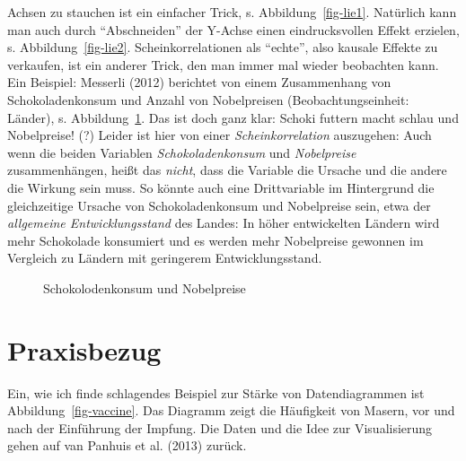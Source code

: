 \documentclass[
  letterpaper,
  oneside,
  open=any]{scrbook}
\theoremstyle{definition}
\theoremstyle{definition}
\theoremstyle{definition}
\theoremstyle{remark}
\begin{document}
Achsen zu stauchen ist ein einfacher Trick, s. Abbildung~\ref{fig-lie1}.
Natürlich kann man auch durch \enquote{Abschneiden} der Y-Achse einen
eindrucksvollen Effekt erzielen, s. Abbildung~\ref{fig-lie2}.
Scheinkorrelationen als \enquote{echte}, also kausale Effekte zu
verkaufen, ist ein anderer Trick, den man immer mal wieder beobachten
kann. Ein Beispiel: Messerli (2012) berichtet von einem Zusammenhang von
Schokoladenkonsum und Anzahl von Nobelpreisen (Beobachtungseinheit:
Länder), s. Abbildung~\ref{fig-choc}. Das ist doch ganz klar: Schoki
futtern macht schlau und Nobelpreise! (?) Leider ist hier von einer
\emph{Scheinkorrelation} auszugehen: Auch wenn die beiden Variablen
\emph{Schokoladenkonsum} und \emph{Nobelpreise} zusammenhängen, heißt
das \emph{nicht}, dass die Variable die Ursache und die andere die
Wirkung sein muss. So könnte auch eine Drittvariable im Hintergrund die
gleichzeitige Ursache von Schokoladenkonsum und Nobelpreise sein, etwa
der \emph{allgemeine Entwicklungsstand} des Landes: In höher
entwickelten Ländern wird mehr Schokolade konsumiert und es werden mehr
Nobelpreise gewonnen im Vergleich zu Ländern mit geringerem
Entwicklungsstand.

\begin{figure}


\caption{\label{fig-choc}Schokolodenkonsum und Nobelpreise}

\end{figure}%

\section{Praxisbezug}\label{praxisbezug-3}

Ein, wie ich finde schlagendes Beispiel zur Stärke von Datendiagrammen
ist Abbildung~\ref{fig-vaccine}. Das Diagramm zeigt die Häufigkeit von
Masern, vor und nach der Einführung der Impfung. Die Daten und die Idee
zur Visualisierung gehen auf van Panhuis et al. (2013) zurück.
\end{document}
